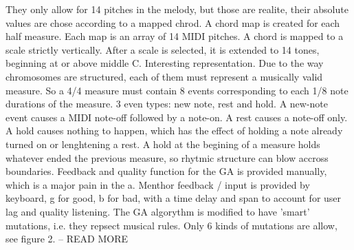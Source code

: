 \cite{Biles1994} They only allow for 14 pitches in the melody, but those are realite, their absolute values are chose according to a mapped chrod. A chord map is created for each half measure. Each map is an array of 14 MIDI pitches. A chord is mapped to a scale strictly vertically. After a scale is selected, it is extended to 14 tones, beginning at or above middle C. Interesting representation. Due to the way chromosomes are structured, each of them must represent a musically valid measure. So a 4/4 measure must contain 8 events corresponding to each 1/8 note durations of the measure. 3 even types: new note, rest and hold. A new-note event causes a MIDI note-off followed by a note-on. A rest causes a note-off only. A hold causes nothing to happen, which has the effect of holding a note already turned on or lenghtening a rest. A hold at the begining of a measure holds whatever ended the previous measure, so rhytmic structure can blow accross boundaries. Feedback and quality function for the GA is provided manually, which is a major pain in the a. Menthor feedback / input is provided by keyboard, g for good, b for bad, with a time delay and span to account for user lag and quality listening. The GA algorythm is modified to have 'smart' mutations, i.e. they repsect musical rules. Only 6 kinds of mutations are allow, see figure 2. -- READ MORE

